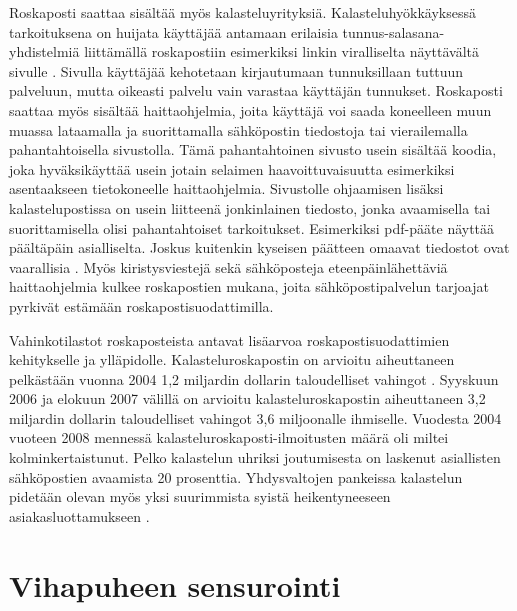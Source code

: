 Roskaposti saattaa sisältää myös kalasteluyrityksiä. Kalasteluhyökkäyksessä tarkoituksena on huijata käyttäjää antamaan erilaisia tunnus-salasana-yhdistelmiä liittämällä roskapostiin esimerkiksi linkin viralliselta näyttävältä sivulle \citep{phishing}. Sivulla käyttäjää kehotetaan kirjautumaan tunnuksillaan tuttuun palveluun, mutta oikeasti palvelu vain varastaa käyttäjän tunnukset. Roskaposti saattaa myös sisältää haittaohjelmia, joita käyttäjä voi saada koneelleen muun muassa lataamalla ja suorittamalla sähköpostin tiedostoja tai vierailemalla pahantahtoisella sivustolla. Tämä pahantahtoinen sivusto usein sisältää koodia, joka hyväksikäyttää usein jotain selaimen haavoittuvaisuutta esimerkiksi asentaakseen tietokoneelle haittaohjelmia. Sivustolle ohjaamisen lisäksi kalastelupostissa on usein liitteenä jonkinlainen tiedosto, jonka avaamisella tai suorittamisella olisi pahantahtoiset tarkoitukset. Esimerkiksi pdf-pääte näyttää päältäpäin asialliselta. Joskus kuitenkin kyseisen päätteen omaavat tiedostot ovat vaarallisia \citep{hoxhunt}. Myös kiristysviestejä sekä sähköposteja eteenpäinlähettäviä haittaohjelmia kulkee roskapostien mukana, joita sähköpostipalvelun tarjoajat pyrkivät estämään roskapostisuodattimilla.

Vahinkotilastot roskaposteista antavat lisäarvoa roskapostisuodattimien kehitykselle ja ylläpidolle. Kalasteluroskapostin on arvioitu aiheuttaneen pelkästään vuonna 2004 1,2 miljardin dollarin taloudelliset vahingot \citep{indirect}. Syyskuun 2006 ja elokuun 2007 välillä on arvioitu kalasteluroskapostin aiheuttaneen 3,2 miljardin dollarin taloudelliset vahingot 3,6 miljoonalle ihmiselle. Vuodesta 2004 vuoteen 2008 mennessä kalasteluroskaposti-ilmoitusten määrä oli miltei kolminkertaistunut. Pelko kalastelun uhriksi joutumisesta on laskenut asiallisten sähköpostien avaamista 20 prosenttia. Yhdysvaltojen pankeissa kalastelun pidetään olevan myös yksi suurimmista syistä heikentyneeseen asiakasluottamukseen \citep{stats-phishing}.

\section{Vihapuheen sensurointi}

